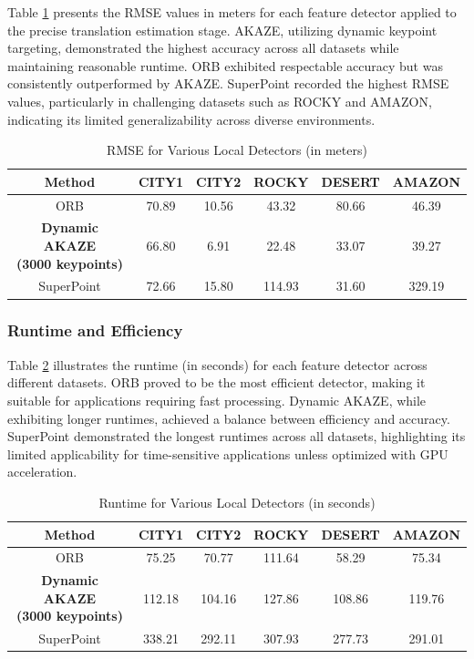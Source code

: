 Table \ref{tab:rmse_detectors} presents the RMSE values in meters for each feature detector applied to the precise translation estimation stage. AKAZE, utilizing dynamic keypoint targeting, demonstrated the highest accuracy across all datasets while maintaining reasonable runtime. ORB exhibited respectable accuracy but was consistently outperformed by AKAZE. SuperPoint recorded the highest RMSE values, particularly in challenging datasets such as ROCKY and AMAZON, indicating its limited generalizability across diverse environments.

\begin{table}[H]
    \centering
    \caption{RMSE for Various Local Detectors (in meters)}
    \label{tab:rmse_detectors}
    \begin{tabular}{|c|c|c|c|c|c|}
    \hline
    \textbf{Method} & \textbf{CITY1} & \textbf{CITY2} & \textbf{ROCKY} & \textbf{DESERT} & \textbf{AMAZON} \\ \hline
    ORB & 70.89 & 10.56 & 43.32 & 80.66 & 46.39 \\ \hline
    \makecell{\textbf{Dynamic AKAZE} \\ \textbf{(3000 keypoints)}} & 66.80 & 6.91 & 22.48 & 33.07 & 39.27 \\ \hline
    SuperPoint & 72.66 & 15.80 & 114.93 & 31.60 & 329.19 \\ \hline
    \end{tabular}
\end{table}

\subsubsection*{Runtime and Efficiency}

Table \ref{tab:runtime_detectors} illustrates the runtime (in seconds) for each feature detector across different datasets. ORB proved to be the most efficient detector, making it suitable for applications requiring fast processing. Dynamic AKAZE, while exhibiting longer runtimes, achieved a balance between efficiency and accuracy. SuperPoint demonstrated the longest runtimes across all datasets, highlighting its limited applicability for time-sensitive applications unless optimized with GPU acceleration.

\begin{table}[H]
    \centering
    \caption{Runtime for Various Local Detectors (in seconds)}
    \label{tab:runtime_detectors}
    \begin{tabular}{|c|c|c|c|c|c|}
    \hline
    \textbf{Method} & \textbf{CITY1} & \textbf{CITY2} & \textbf{ROCKY} & \textbf{DESERT} & \textbf{AMAZON} \\ \hline
    ORB & 75.25 & 70.77 & 111.64 & 58.29 & 75.34 \\ \hline
    \makecell{\textbf{Dynamic AKAZE} \\ \textbf{(3000 keypoints)}} & 112.18 & 104.16 & 127.86 & 108.86 & 119.76 \\ \hline
    SuperPoint & 338.21 & 292.11 & 307.93 & 277.73 & 291.01 \\ \hline
    \end{tabular}
\end{table}

